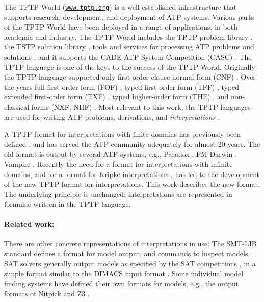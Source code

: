 \documentclass{easychair}
\begin{document}
The TPTP World \cite{Sut17} (\href{https://www.tptp.org}{\tt www.tptp.org}) is a well established 
infrastructure that supports research, development, and deployment of 
ATP systems.
Various parts of the TPTP World have been deployed in a range of applications, in both academia 
and industry.
The TPTP World includes the TPTP problem library \cite{Sut09}, 
the TSTP solution library \cite{Sut10}, 
tools and services for processing ATP problems and solutions \cite{Sut10}, 
and it supports the CADE ATP System Competition (CASC) \cite{Sut16}.
The TPTP language \cite{Sut23-IGPL} is one of the keys to the success of the TPTP World.
Originally the TPTP language supported only first-order clause normal form (CNF) \cite{SS98-JAR}.
Over the years full first-order form (FOF) \cite{Sut09}, 
typed first-order form (TFF) \cite{SS+12,BP13-TFF1}, 
typed extended first-order form (TXF) \cite{SK18}, 
typed higher-order form (THF) \cite{SB10,KSR16}, 
and non-classical forms (NXF, NHF) \cite{SF+22}.
Most relevant to this work, the TPTP languages are used for writing ATP problems, derivations, 
and \emph{interpretations} \cite{SS+06,Sut08-KEAPPA}.

A TPTP format for interpretations with finite domains has previously been defined \cite{SS+06},
and has served the ATP community adequately for almost 20 years. 
The old format is output by several ATP systems, e.g., Paradox \cite{CS03}, FM-Darwin \cite{BF+06}, 
Vampire \cite{KV13}.
Recently the need for a format for interpretations with infinite domains, and for a format for 
Kripke interpretations \cite{Kri63}, has led to the development of the new TPTP format for 
interpretations.
This work describes the new format.
The underlying principle is unchanged: interpretations are represented in formulae written in
the TPTP language.

\paragraph{Related work:}
There are other concrete representations of interpretations in use:
The SMT-LIB standard \cite{BFT17} defines a format for model output, and commands to inspect 
models.  
SAT solvers generally output models as specified by the SAT competitions \cite{JL+12}, in a 
simple format similar to the DIMACS input format \cite{Bab93}.
Some individual model finding systems have defined their own formats for models, e.g., the 
output formats of Nitpick \cite{BN10-ITP} and Z3 \cite{dMB08}.
\end{document}

